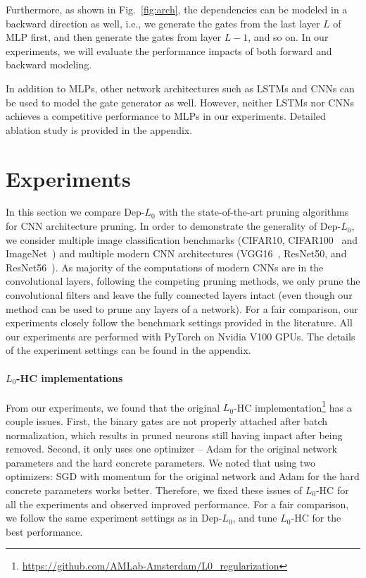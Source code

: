 \documentclass[runningheads, envcountsame, a4paper]{llncs}
\begin{document}
Furthermore, as shown in Fig.~\ref{fig:arch}, the dependencies can be modeled in a backward direction as well, i.e., we generate the gates from the last layer $L$ of MLP first, and then generate the gates from layer $L-1$, and so on. In our experiments, we will evaluate the performance impacts of both forward and backward modeling.

In addition to MLPs, other network architectures such as LSTMs and CNNs can be used to model the gate generator as well. However, neither LSTMs nor CNNs achieves a competitive performance to MLPs in our experiments. Detailed ablation study is provided in the appendix.


\section{Experiments}

In this section we compare Dep-$L_0$ with the state-of-the-art pruning algorithms for CNN architecture pruning. In order to demonstrate the generality of Dep-$L_0$, we consider multiple image classification benchmarks (CIFAR10, CIFAR100~\cite{krizhevsky2009learning} and ImageNet~\cite{deng2009imagenet}) and multiple modern CNN architectures (VGG16~\cite{simonyan2014very}, ResNet50, and ResNet56~\cite{he2016deep}). As majority of the computations of modern CNNs are in the convolutional layers, following the competing pruning methods, we only prune the convolutional filters and leave the fully connected layers intact (even though our method can be used to prune any layers of a network). For a fair comparison, our experiments closely follow the benchmark settings provided in the literature. All our experiments are performed with PyTorch on Nvidia V100 GPUs. The details of the experiment settings can be found in the appendix.

\paragraph{\textbf{$L_0$-HC implementations}}
From our experiments, we found that the original $L_0$-HC implementation\footnote{\url{https://github.com/AMLab-Amsterdam/L0\_regularization}} has a couple issues. First, the binary gates are not properly attached after batch normalization, which results in pruned neurons still having impact after being removed. Second, it only uses one optimizer -- Adam for the original network parameters and the hard concrete parameters. We noted that using two optimizers: SGD with momentum for the original network and Adam for the hard concrete parameters works better. Therefore, we fixed these issues of $L_0$-HC for all the experiments and observed improved performance. For a fair comparison, we follow the same experiment settings as in Dep-$L_0$, and tune $L_0$-HC for the best performance.
\end{document}
